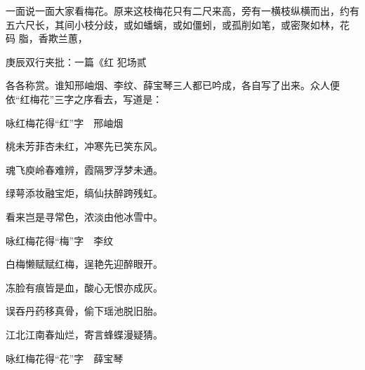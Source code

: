 \begin{parag}
    一面说一面大家看梅花。原来这枝梅花只有二尺来高，旁有一横枝纵横而出，约有五六尺长，其间小枝分歧，或如蟠螭，或如僵蚓，或孤削如笔，或密聚如林，花 码 脂，香欺兰蕙，\begin{note}庚辰双行夹批：一篇《红 犯场贰\end{note}各各称赏。谁知邢岫烟、李纹、薛宝琴三人都已吟成，各自写了出来。众人便依“红梅花”三字之序看去，写道是：
\end{parag}


\begin{poem}
    \begin{pl}

        咏红梅花得“红”字　邢岫烟
    \end{pl}
    \begin{pl}

        桃未芳菲杏未红，冲寒先已笑东风。
    \end{pl}
    \begin{pl}

        魂飞庾岭春难辨，霞隔罗浮梦未通。
    \end{pl}
    \begin{pl}

        绿萼添妆融宝炬，缟仙扶醉跨残虹。
    \end{pl}
    \begin{pl}

        看来岂是寻常色，浓淡由他冰雪中。
    \end{pl}

    \emptypl

    \begin{pl}
        咏红梅花得“梅”字　李纹
    \end{pl}
    \begin{pl}

        白梅懒赋赋红梅，逞艳先迎醉眼开。
    \end{pl}
    \begin{pl}

        冻脸有痕皆是血，酸心无恨亦成灰。
    \end{pl}
    \begin{pl}

        误吞丹药移真骨，偷下瑶池脱旧胎。
    \end{pl}
    \begin{pl}

        江北江南春灿烂，寄言蜂蝶漫疑猜。
    \end{pl}

    \emptypl
    \begin{pl}
        咏红梅花得“花”字　薛宝琴
    \end{pl}
    \begin{pl}


\end{pl}
\end{poem}
